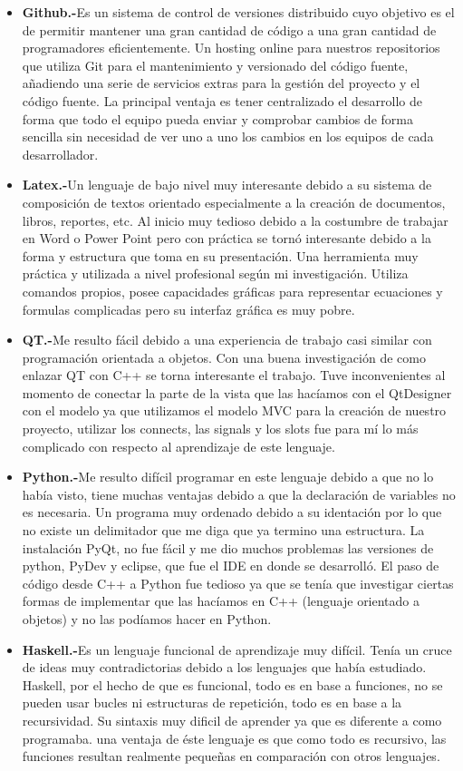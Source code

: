 \documentclass[10pt,oneside]{report}
\begin{document}
\begin{itemize}\renewcommand{\labelitemi}{$\bullet$}
	\item {\bf Github.-}\textsf{Es un sistema de control de versiones distribuido cuyo objetivo es el de permitir mantener una gran cantidad de código a una gran cantidad de programadores eficientemente. Un hosting online para nuestros repositorios que utiliza Git para el mantenimiento y versionado del código fuente, añadiendo una serie de servicios extras para la gestión del proyecto y el código fuente. La principal ventaja es tener centralizado el desarrollo de forma que todo el equipo pueda enviar y comprobar cambios de forma sencilla sin necesidad de ver uno a uno los cambios en los equipos de cada desarrollador.}
	\item {\bf Latex.-}\textsf{Un lenguaje de bajo nivel muy interesante debido a su sistema de composición de textos orientado especialmente a la creación de documentos, libros, reportes, etc. Al inicio muy tedioso debido a la costumbre de trabajar en Word o Power Point pero con práctica se tornó interesante debido a la forma y  estructura que toma en su presentación. Una herramienta muy práctica y utilizada a nivel profesional según mi investigación. Utiliza comandos propios, posee capacidades gráficas para representar ecuaciones y formulas complicadas pero su interfaz gráfica es muy pobre.}
	\item {\bf QT.-}\textsf{Me resulto fácil debido a una experiencia de trabajo casi similar con programación orientada a objetos. Con una buena investigación de como enlazar QT con C++ se torna interesante el trabajo. Tuve inconvenientes al momento de conectar la parte de la vista que las hacíamos con el QtDesigner con el modelo ya que utilizamos el modelo MVC para la creación de nuestro proyecto, utilizar los connects, las signals y los slots fue para mí lo más complicado con respecto al aprendizaje de este lenguaje. }
	\item {\bf Python.-}\textsf{Me resulto difícil  programar en este lenguaje debido a que no lo había visto,  tiene muchas ventajas debido a que la declaración de variables no es necesaria. Un programa muy ordenado debido a su identación por lo que no existe un delimitador que me diga que ya termino una estructura. La instalación PyQt, no fue fácil y me dio muchos problemas las versiones de python, PyDev y eclipse, que fue el IDE en donde se desarrolló. El paso de código desde C++ a Python fue tedioso ya que se tenía que investigar ciertas formas de implementar que las hacíamos en C++ (lenguaje orientado a objetos) y no las podíamos hacer en Python.}
	\item {\bf Haskell.-}\textsf{Es un lenguaje funcional de aprendizaje muy difícil. Tenía un cruce de ideas muy contradictorias debido a los lenguajes que había estudiado. Haskell, por el hecho de que es funcional, todo es en base a funciones, no se pueden usar bucles ni estructuras de repetición, todo es en base a la recursividad. Su sintaxis muy dificil de aprender ya que es diferente a como programaba. una ventaja de éste lenguaje es que como todo es recursivo, las funciones resultan realmente pequeñas en comparación con otros lenguajes.} 
\end{itemize}\newpage
\end{document}
